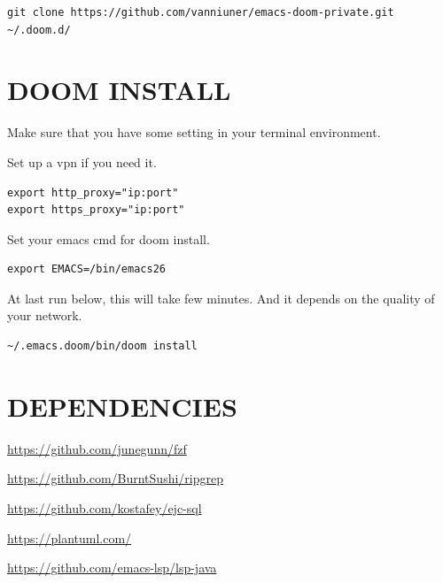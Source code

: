 \documentclass[11pt]{article}
\begin{document}
\begin{verbatim}
git clone https://github.com/vanniuner/emacs-doom-private.git ~/.doom.d/
\end{verbatim}
\section{DOOM INSTALL}
\label{sec:org7674ed5}
Make sure that you have some setting in your terminal environment.

Set up a vpn if you need it.

\begin{verbatim}
export http_proxy="ip:port"
export https_proxy="ip:port"
\end{verbatim}

Set your emacs cmd for doom install.

\begin{verbatim}
export EMACS=/bin/emacs26
\end{verbatim}

At last run below, this will take few minutes. And it depends on the quality of your network.

\begin{verbatim}
~/.emacs.doom/bin/doom install
\end{verbatim}
\section{DEPENDENCIES}
\label{sec:org00914c0}

\url{https://github.com/junegunn/fzf}

\url{https://github.com/BurntSushi/ripgrep}

\url{https://github.com/kostafey/ejc-sql}

\url{https://plantuml.com/}

\url{https://github.com/emacs-lsp/lsp-java}
\end{document}
